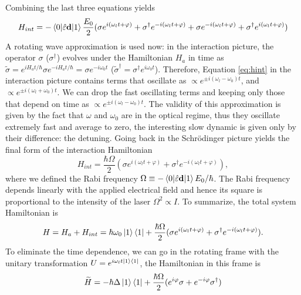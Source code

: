 Combining the last three equations yields
\begin{equation}
\label{eq:hint}
H_{int} = - \braket{0|\hat{\varepsilon} \mathbf{d}|1}\frac{E_0}{2}(\sigma e^{i(\omega_l t+\varphi)} + \sigma^\dagger e^{-i(\omega_l t+\varphi)} + \sigma e^{-i(\omega_l t+\varphi)} + \sigma^\dagger e^{i(\omega_l t+\varphi)})
\end{equation}
A rotating wave approximation is used now: in the interaction picture, the operator $\sigma$ ($\sigma^\dagger$) evolves under the Hamiltonian $H_a$ in time as $\widetilde{\sigma} = e^{i H_a t/\hbar}\sigma e^{-i H_a t/\hbar} = \sigma e^{-i\omega_0 t}$ ($\widetilde{\sigma}^\dagger=\sigma^\dagger e^{i\omega_0 t}$). Therefore, Equation \ref{eq:hint} in the interaction picture contains terms that oscillate as $\propto e^{\pm i(\omega_l-\omega_0 )t}$, and $\propto e^{\pm i(\omega_l+\omega_0 )t}$. We can drop the fast oscillating terms and keeping only those that depend on time as $\propto e^{\pm i(\omega_l-\omega_0 )t}$. The validity of this approximation is given by the fact that $\omega$ and $\omega_0$ are in the optical regime, thus they oscillate extremely fast and average to zero, the interesting slow dynamic is given only by their difference: the detuning.
Going back in the Schrödinger picture yields the final form of the interaction Hamiltonian
\begin{equation}
H_{int} = \frac{\hbar \Omega}{2}(\sigma e^{i(\omega_l t+\varphi)} + \sigma^\dagger e^{-i(\omega_l t+\varphi)}),
\end{equation}
 where we defined the Rabi frequency $\Omega \equiv - \braket{0|\hat{\varepsilon} \mathbf{d}|1}E_0/\hbar$. The Rabi frequency depends linearly with the applied electrical field and hence its square is proportional to the intensity of the laser $\Omega ^2 \propto I$. To summarize, the total system Hamiltonian is
 \begin{equation}
 \label{2levelatomhamiltonian}
H = H_a + H_{int} = \hbar\omega_0 \ket{1}\bra{1} + \frac{\hbar \Omega}{2}(\sigma e^{i(\omega_l t+\varphi)} + \sigma^\dagger e^{-i(\omega_l t+\varphi)}).
 \end{equation}
To eliminate the time dependence, we can go in the rotating frame with the unitary transformation $U = e^{i\omega_l t \ket{1}\bra{1}}$, the Hamiltonian in this frame is
\begin{equation}
\label{Hamiltonianrotatingframe}
\widetilde{H} = -\hbar \Delta \ket{1}\bra{1} + \frac{\hbar \Omega}{2}(e^{i\varphi}\sigma + e^{-i\varphi}\sigma^\dagger)
\end{equation}
